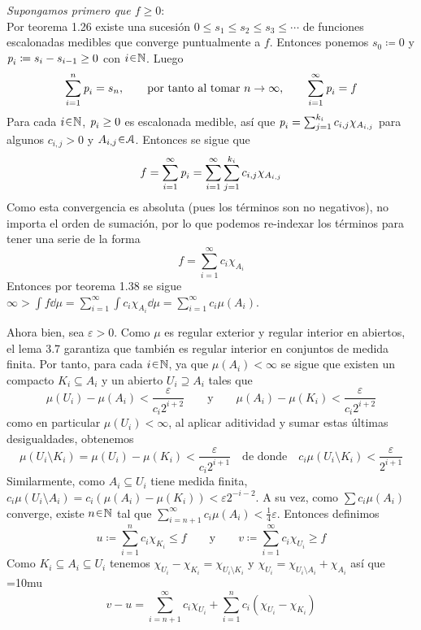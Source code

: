 \begin{sol}
\emph{Supongamos primero que $f\ge0$}:\\
Por teorema 1.26 existe una sucesión $0\le s_1\leq s_2 \le s_3 \leq \cdots$ de funciones escalonadas medibles que converge puntualmente a $f$. Entonces ponemos $s_0 \coloneq 0$ y $\operatorname{\textit{p}}_i \coloneq s_i -s_{i-1} \ge 0$ con $i\en\mathbb{N}$. Luego
\[
\sum^n_{i=1}\operatorname{\textit{p}}_i = s_n,
\qquad\text{por tanto al tomar } n\to\infty,\qquad
\sum^\infty_{i=1} \operatorname{\textit{p}}_i = f
\]
Para cada $i\en\mathbb{N}$, $\operatorname{\textit{p}}_i \ge 0$ es escalonada medible, así que $\operatorname{\textit{p}}_i = \sum^{k_i}_{j=1}c_{i,j}\chi_{A_{i,j}}$ para algunos $c_{i,j} > 0$ y $A_{i,j} \en\mathcal{A}$. Entonces se sigue que
\[
f
= \sum^\infty_{i=1} \operatorname{\textit{p}}_i
= \sum^\infty_{i=1}\sum^{k_i}_{j=1}c_{i,j}\chi_{A_{i,j}}
\]
Como esta convergencia es absoluta (pues los términos son no negativos), no importa el orden de sumación, por lo que podemos re-indexar los términos para tener una serie de la forma
\[
f = \sum^{\infty}_{i=1} c_i\chi_{A_i}
\]
Entonces por teorema 1.38 se sigue $\infty >\int f \dd{\mu} = \sum^{\infty}_{i=1} \int c_i\chi_{A_i} \dd{\mu} = \sum^{\infty}_{i=1} c_i\mu({A_i})$.\par
Ahora bien, sea $\varepsilon>0$. Como $\mu$ es regular exterior y regular interior en abiertos, el lema 3.7 garantiza que también es regular interior en conjuntos de medida finita. Por tanto, para cada $i\en\mathbb{N}$, ya que $\mu(A_i) < \infty$ se sigue que existen un compacto $K_i \subseteq A_i$ y un abierto $U_i \supseteq A_i$ tales que
\[
\mu(U_i) - \mu(A_i) < \frac{\varepsilon}{c_i2^{i+2}}
\qquad\text{y}\qquad
\mu(A_i) - \mu(K_i) < \frac{\varepsilon}{c_i2^{i+2}}
\]
como en particular $\mu(U_i) < \infty$, al aplicar aditividad y sumar estas últimas desigualdades, obtenemos 
\[
\mu(U_i \setminus K_i) = \mu(U_i) - \mu(K_i) < \frac{\varepsilon}{c_i2^{i+1}}
\quad\text{de donde}\quad
c_i\mu(U_i \setminus K_i) < \frac{\varepsilon}{2^{i+1}}
\]
Similarmente, como $A_i \subseteq U_i$ tiene medida finita, $c_i\mu(U_i\setminus A_i) =c_i(\mu(A_i) - \mu(K_i)) < \varepsilon2^{-i-2}$.
A su vez, como $\sum c_i\mu(A_i)$ converge, existe $n\en\mathbb{N}$ tal que $\sum^\infty_{i=n+1} c_i\mu(A_i) < \frac14\varepsilon$. Entonces definimos
\[
u \coloneq \sum_{i=1}^n c_i \chi_{K_i} \le f 
\qquad\text{y}\qquad
v \coloneq \sum_{i=1}^\infty c_i \chi_{U_i} \ge f
\]
Como $K_i \subseteq A_i \subseteq U_i$ tenemos $\chi_{U_i} - \chi_{K_i}=\chi_{U_i\setminus K_i}$ y $\chi_{U_i} = \chi_{U_i\setminus A_i} + \chi_{A_i}$ así que
{\thickmuskip=10mu
\[
v-u 
= \sum^{\infty}_{i=n+1}c_i\chi_{U_i} + \sum_{i=1}^n c_i (\chi_{U_i} - \chi_{K_i})
\]}
\end{sol}
